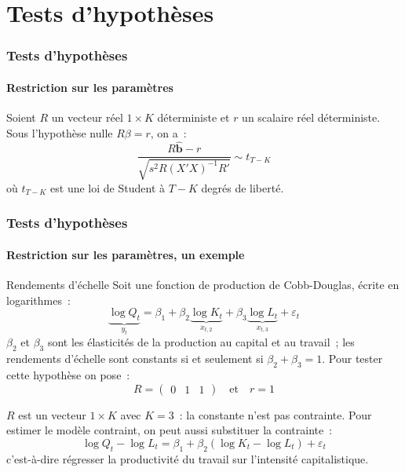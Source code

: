 \documentclass[10pt]{beamer}
\begin{document}
\section{Tests d'hypothèses}

\begin{frame}
  \frametitle{Tests d'hypothèses}
  \framesubtitle{Restriction sur les paramètres}

  \begin{theorem}\label{thm:test:single_linear_restriction}
    Soient $R$ un vecteur réel $1\times K$ déterministe et $r$ un scalaire réel déterministe. Sous l'hypothèse nulle $R\beta = r$, on a~:
    \[
      \frac{R\hat{\mathbf b}-r}{\sqrt{s^2R(X'X)^{-1}R'}} \sim t_{T-K}
    \]
    où $t_{T-K}$ est une loi de Student à $T-K$ degrés de liberté.
  \end{theorem}

\end{frame}


\begin{frame}
  \frametitle{Tests d'hypothèses}
  \framesubtitle{Restriction sur les paramètres, un exemple}

  \begin{exemple}{Rendements d'échelle}
    Soit une fonction de production de Cobb-Douglas, écrite en logarithmes~:
    \[
      \underbrace{\log Q_t}_{y_t} = \beta_1 + \beta_2 \underbrace{\log K_t}_{x_{t,2}}
      + \beta_3 \underbrace{\log L_t}_{x_{t,3}} + \varepsilon_t
    \]
    $\beta_2$ et $\beta_3$ sont les élasticités de la production au capital et au
    travail~; les rendements d'échelle sont constants si et seulement
    si $\beta_2+\beta_3=1$. Pour tester cette hypothèse on pose~:
    \[
      R = \begin{pmatrix} 0 & 1 & 1\end{pmatrix} \quad\text{et}\quad r=1
    \]
  \end{exemple}

  \medskip

  {\small $R$ est un vecteur $1\times K$ avec $K=3$~: la constante n'est pas
    contrainte. Pour estimer le modèle contraint, on peut aussi substituer la
    contrainte~:
    \[
      \log Q_t - \log L_t = \beta_1 + \beta_2\left( \log K_t - \log L_t \right) + \varepsilon_t
    \]
    c'est-à-dire régresser la productivité du travail sur l'intensité
    capitalistique.}

\end{frame}
\end{document}
